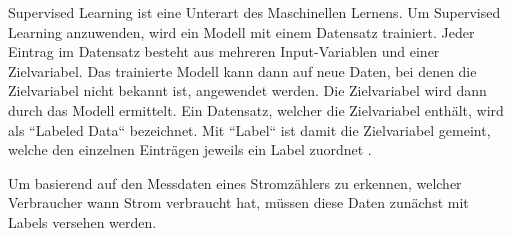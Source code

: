 Supervised Learning ist eine Unterart des Maschinellen Lernens.
Um Supervised Learning anzuwenden, wird ein Modell mit einem Datensatz trainiert.
Jeder Eintrag im Datensatz besteht aus mehreren Input-Variablen und einer Zielvariabel.
Das trainierte Modell kann dann auf neue Daten, bei denen die Zielvariabel nicht bekannt ist, angewendet werden.
Die Zielvariabel wird dann durch das Modell ermittelt.
Ein Datensatz, welcher die Zielvariabel enthält, wird als ``Labeled Data`` bezeichnet.
Mit ``Label`` ist damit die Zielvariabel gemeint,
welche den einzelnen Einträgen jeweils ein Label zuordnet \parencite{ml_for_dummies}.

Um basierend auf den Messdaten eines Stromzählers zu erkennen,
welcher Verbraucher wann Strom verbraucht hat,
müssen diese Daten zunächst mit Labels versehen werden.


